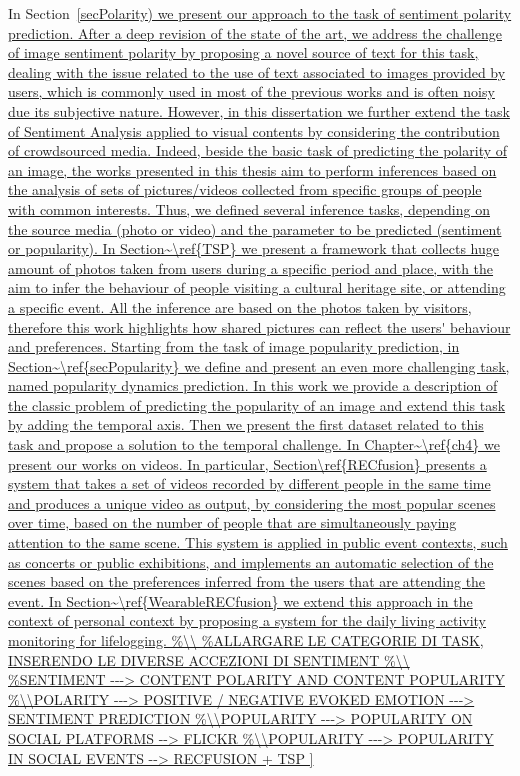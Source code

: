 In Section~\ref{secPolarity) we present our approach to the task of sentiment polarity prediction. After a deep revision of the state of the art, we address the challenge of image sentiment polarity by proposing a novel source of text for this task, dealing with the issue related to the use of text associated to images provided by users, which is commonly used in most of the previous works and is often noisy due its subjective nature.
However, in this dissertation we further extend the task of Sentiment Analysis applied to visual contents by considering the contribution of crowdsourced media. Indeed, beside the basic task of predicting the polarity of an image, the works presented in this thesis aim to perform inferences based on the analysis of sets of pictures/videos collected from specific groups of people with common interests. Thus, we defined several inference tasks, depending on the source media (photo or video) and the parameter to be predicted (sentiment or popularity). 
In Section~\ref{TSP} we present a framework that collects huge amount of photos taken from users during a specific period and place, with the aim to infer the behaviour of people visiting a cultural heritage site, or attending a specific event. All the inference are based on the photos taken by visitors, therefore this work highlights how shared pictures can reflect the users' behaviour and preferences.
Starting from the task of image popularity prediction, in Section~\ref{secPopularity} we define and present an even more challenging task, named popularity dynamics prediction. In this work we provide a description of the classic problem of predicting the popularity of an image and extend this task by adding the temporal axis. 
Then we present the first dataset related to this task and propose a solution to the temporal challenge.
In Chapter~\ref{ch4} we present our works on videos. In particular, Section\ref{RECfusion} presents a system that takes a set of videos recorded by different people in the same time and produces a unique video as output, by considering the most popular scenes over time, based on the number of people that are simultaneously paying attention to the same scene. This system is applied in public event contexts, such as concerts or public exhibitions, and implements an automatic selection of the scenes based on the preferences inferred from the users that are attending the event.
In Section~\ref{WearableRECfusion} we extend this approach in the context of personal context by proposing a system for the daily living activity monitoring for lifelogging.

}
